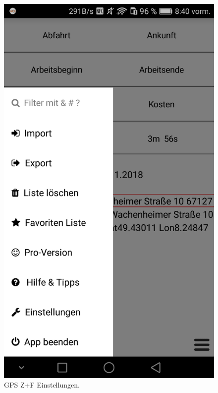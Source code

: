 \documentclass[a4paper]{article}
\begin{document}
\begin{figure}[H]%
    \begin{minipage}[b]{.4\linewidth} %
        \includegraphics[scale=0.14]{img/gps3}
        \caption{\label{img:img/gps3}GPS Z+F Einstellungen.}
    \end{minipage}
    \hspace{0.1\linewidth}%
    \begin{minipage}[b]{.4\linewidth} %

\end{minipage}
\end{figure}
\end{document}
